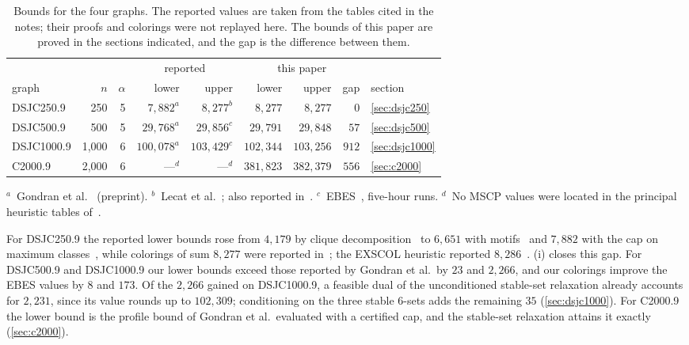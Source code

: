 \documentclass[11pt]{article}
\theoremstyle{definition}
\newcommand{\DSJCTwoFifty}{\textnormal{\textsc{DSJC250.9}}}
\newcommand{\DSJCFiveHundred}{\textnormal{\textsc{DSJC500.9}}}
\newcommand{\DSJCThousand}{\textnormal{\textsc{DSJC1000.9}}}
\newcommand{\CTwoThousand}{\textnormal{\textsc{C2000.9}}}
\begin{document}
\begin{table}[t]
\centering
\small
\caption{Bounds for the four graphs. The reported values are taken from the
tables cited in the notes; their proofs and colorings were not replayed here.
The bounds of this paper are proved in the sections indicated, and the gap is
the difference between them.}
\label{tab:results}
\begin{tabular}{@{}lrrrrrrrl@{}}
\toprule
& & & \multicolumn{2}{c}{reported} & \multicolumn{3}{c}{this paper} & \\
\cmidrule(lr){4-5}\cmidrule(lr){6-8}
graph & $n$ & $\alpha$ & lower & upper & lower & upper & gap & section\\
\midrule
\DSJCTwoFifty{}    & 250   & 5 & $7{,}882^{a}$   & $8{,}277^{b}$   & $8{,}277$   & $8{,}277$   & $0$   & \ref{sec:dsjc250}\\
\DSJCFiveHundred{} & 500   & 5 & $29{,}768^{a}$  & $29{,}856^{c}$  & $29{,}791$  & $29{,}848$  & $57$  & \ref{sec:dsjc500}\\
\DSJCThousand{}    & 1,000 & 6 & $100{,}078^{a}$ & $103{,}429^{c}$ & $102{,}344$ & $103{,}256$ & $912$ & \ref{sec:dsjc1000}\\
\CTwoThousand{}    & 2,000 & 6 & ---$^{d}$       & ---$^{d}$       & $381{,}823$ & $382{,}379$ & $556$ & \ref{sec:c2000}\\
\bottomrule
\end{tabular}

\smallskip
\begin{minipage}{0.94\textwidth}
\footnotesize
$^{a}$~Gondran et al.~\cite[Table~1]{gondran2019} (preprint).
$^{b}$~Lecat et al.~\cite[Table~2]{lecat2017}; also reported
in~\cite{moukrim2013,jinhao2016}.
$^{c}$~EBES~\cite[Table~1]{wuetal2018}, five-hour runs.
$^{d}$~No MSCP values were located in the principal heuristic tables
of~\cite{wuhao2012,moukrim2013,jinhao2016,wuetal2018}.
\end{minipage}
\end{table}

For \DSJCTwoFifty{} the reported lower bounds rose from $4{,}179$ by clique
decomposition~\cite[Table~1]{wuhao2013} to $6{,}651$ with
motifs~\cite[Table~2]{lecat2017} and $7{,}882$ with the cap on maximum
classes~\cite[Table~1]{gondran2019}, while colorings of sum $8{,}277$ were
reported in~\cite{moukrim2013,jinhao2016,lecat2017}; the EXSCOL heuristic
reported $8{,}286$~\cite[Table~1]{wuhao2012}. (i) closes
this gap. For \DSJCFiveHundred{} and \DSJCThousand{} our lower bounds exceed
those reported by Gondran et al.\ by $23$ and $2{,}266$, and our colorings
improve the EBES values by $8$ and $173$. Of the $2{,}266$ gained on
\DSJCThousand{}, a feasible dual of the unconditioned stable-set relaxation
already accounts for $2{,}231$, since its value rounds up to $102{,}309$;
conditioning on the three stable 6-sets adds the remaining $35$
(\cref{sec:dsjc1000}). For \CTwoThousand{} the lower bound is the profile
bound of Gondran et al.\ evaluated with a certified cap, and the stable-set
relaxation attains it exactly (\cref{sec:c2000}).
\end{document}
